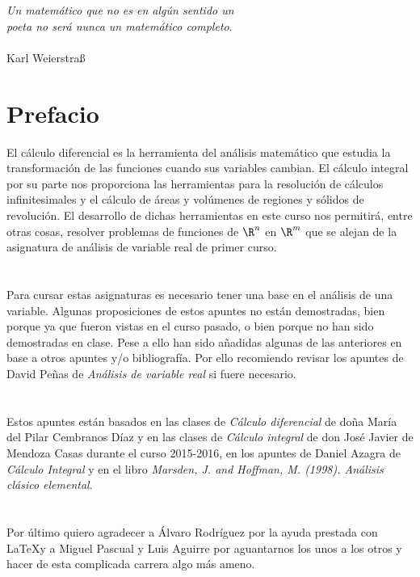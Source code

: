 \blankpage

	\chapter*{}
\begin{flushright}
\textit{Un matemático que no es en algún sentido un\\poeta no será nunca un matemático completo}.\\\ \\ Karl Weierstra\ss
\end{flushright}

	\chapter*{Prefacio}
	El cálculo diferencial es la herramienta del análisis matemático que estudia la transformación de las funciones cuando sus variables cambian. El cálculo integral por su parte nos proporciona las herramientas para la resolución de cálculos infinitesimales y el cálculo de áreas y volúmenes de regiones y sólidos de revolución. El desarrollo de dichas herramientas en este curso nos permitirá, entre otras cosas, resolver problemas de funciones de $\R^n$ en $\R^m$ que se alejan de la asignatura de análisis de variable real de primer curso.\\\\\\
	
	Para cursar estas asignaturas es necesario tener una base en el análisis de una variable. Algunas proposiciones de estos apuntes no están demostradas, bien porque ya que fueron vistas en el curso pasado, o bien porque no han sido demostradas en clase. Pese a ello han sido añadidas algunas de las anteriores en base a otros apuntes y/o bibliografía. Por ello recomiendo revisar los apuntes de David Peñas de \textit{Análisis de variable real} si fuere necesario. \\\\\\
	
	Estos apuntes están basados en las clases de \textit{Cálculo diferencial} de doña María del Pilar Cembranos Díaz y en las clases de \textit{Cálculo integral} de don José Javier de Mendoza Casas durante el curso 2015-2016, en los apuntes de Daniel Azagra de \textit{Cálculo Integral} y en el libro \textit{Marsden, J. and Hoffman, M. (1998). Análisis clásico elemental}. \\\\\\
	
	Por último quiero agradecer a Álvaro Rodríguez por la ayuda prestada con \LaTeX y a Miguel Pascual y Luis Aguirre por aguantarnos los unos a los otros y hacer de esta complicada carrera algo más ameno.
	
	
\mainmatter %

	\tableofcontents